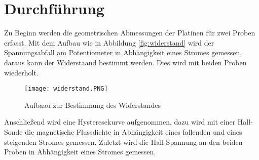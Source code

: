 \section{Durchführung}
\label{sec:Durchführung}
Zu Beginn werden die geometrischen Abmessungen der Platinen für zwei Proben erfasst.
Mit dem Aufbau wie in Abbildung \ref{fig:widerstand} wird der Spannungsabfall am Potentiometer in Abhängigkeit eines Stromes gemessen, daraus kann
der Widerstaand bestimmt werden. Dies wird mit beiden Proben wiederholt.
\begin{figure}
  \centering
  \texttt{[image: widerstand.PNG]}
  \caption{Aufbaau zur Bestimmung des Widerstandes}
  \label{fig:widerstang}
\end{figure}
Anschließend wird eine Hysteresekurve aufgenommen, dazu wird mit einer Hall-Sonde die magnetische Flussdichte in Abhängigkeit
eines fallenden und eines steigenden Stromes gemessen.
Zuletzt wird die Hall-Spannung an den beiden Proben in Abhängigkeit eines Stromes gemessen.
